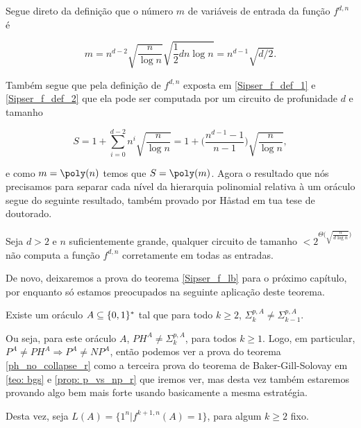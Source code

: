 Segue direto da definição que o número $m$ de variáveis de entrada da função $f^{d, n}$ é

\begin{equation*}
	m = n^{d - 2}\sqrt{\frac{n}{\log n}}\sqrt{\frac{1}{2}dn\log n} = n^{d - 1}\sqrt{d/2}.
\end{equation*}

Também segue que pela definição de $f^{d, n}$ exposta em \ref{Sipser_f_def_1} e \ref{Sipser_f_def_2} que ela pode ser computada por um circuito de profunidade $d$ e tamanho

\begin{equation*}
	S = 1 + \sum_{i = 0}^{d - 2} n^{i}\sqrt{\frac{n}{\log n}} = 1 + \Big(\frac{n^{d - 1} - 1}{n - 1}\Big)\sqrt{\frac{n}{\log n}},
\end{equation*}

e como $m = \poly(n)$ temos que $S = \poly(m)$. Agora o resultado que nós precisamos para separar cada nível da hierarquia polinomial relativa à um oráculo segue do seguinte resultado, também provado por Håstad em tua tese de doutorado.

\begin{teo} \label{Sipser_f_lb}

Seja $d > 2$ e $n$ suficientemente grande, qualquer circuito de tamanho $< 2^{\Theta\big(\sqrt{\frac{n}{d\log n}}\big)}$ não computa a função $f^{d, n}$ corretamente em todas as entradas.

\end{teo}

De novo, deixaremos a prova do teorema \ref{Sipser_f_lb} para o próximo capítulo, por enquanto só estamos preocupados na seguinte aplicação deste teorema.

\begin{teo} \label{ph_no_collapse_r}
Existe um oráculo $A \subseteq \{0, 1\}^{*}$ tal que para todo $k \geq 2$, $\Sigma_{k}^{p, A} \neq \Sigma_{k - 1}^{p, A}$.
\end{teo}

Ou seja, para este oráculo $A$, $PH^{A} \neq \Sigma_{k}^{p, A}$, para todos $k \geq 1$. Logo, em particular, $P^{A} \neq PH^{A} \Rightarrow P^{A} \neq NP^{A}$, então podemos ver a prova do teorema \ref{ph_no_collapse_r} como a terceira prova do teorema de Baker-Gill-Solovay em \ref{teo: bgs} e \ref{prop: p_vs_np_r} que iremos ver, mas desta vez também estaremos provando algo bem mais forte usando basicamente a mesma estratégia.

Desta vez, seja $L(A) = \{1^{n} \lvert f^{k + 1, n}(A) = 1\}$, para algum $k \geq 2$ fixo.

